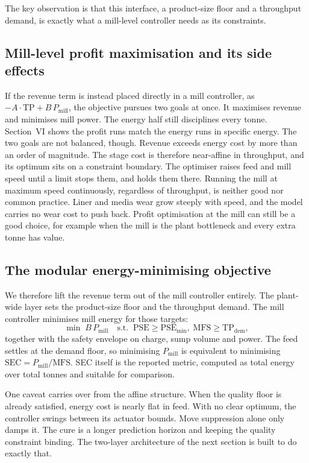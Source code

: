 \documentclass[conference]{IEEEtran}
\begin{document}
The key observation is that this interface, a product-size floor and a
throughput demand, is exactly what a mill-level controller needs as its
constraints.

\subsection{Mill-level profit maximisation and its side effects}

If the revenue term is instead placed directly in a mill controller, as
$-A\cdot\mathrm{TP} + B\,P_{\mathrm{mill}}$, the objective pursues two
goals at once. It maximises revenue and minimises mill power. The energy
half still disciplines every tonne. Section~VI shows the profit runs match
the energy runs in specific energy. The two goals are not balanced,
though. Revenue exceeds energy cost by more than an order of magnitude. The
stage cost is therefore near-affine in throughput, and its optimum sits on
a constraint boundary. The optimiser raises feed and mill speed until a
limit stops them, and holds them there. Running the mill at maximum speed
continuously, regardless of throughput, is neither good nor common
practice. Liner and media wear grow steeply with speed, and the model
carries no wear cost to push back. Profit optimisation at the mill can
still be a good choice, for example when the mill is the plant bottleneck
and every extra tonne has value.

\subsection{The modular energy-minimising objective}

We therefore lift the revenue term out of the mill controller entirely.
The plant-wide layer sets the product-size floor and the throughput
demand. The mill controller minimises mill energy for those targets:
\begin{equation}
\min \; B\,P_{\mathrm{mill}}
\quad \text{s.t.}\;\; \mathrm{PSE}\ge \mathrm{PSE}_{\min},\;
\mathrm{MFS}\ge \mathrm{TP}_{\mathrm{dem}},
\label{eq:sec}
\end{equation}
together with the safety envelope on charge, sump volume and power. The
feed settles at the demand floor, so minimising
$P_{\mathrm{mill}}$ is equivalent to minimising
$\mathrm{SEC}=P_{\mathrm{mill}}/\mathrm{MFS}$. SEC itself is the
reported metric, computed as total energy over total tonnes and suitable
for comparison.

One caveat carries over from the affine structure. When the quality floor
is already satisfied, energy cost is nearly flat in feed. With no clear
optimum, the controller swings between its actuator bounds. Move
suppression alone only damps it. The cure is a longer prediction horizon
and keeping the quality constraint binding. The two-layer architecture of
the next section is built to do exactly that.
\end{document}
